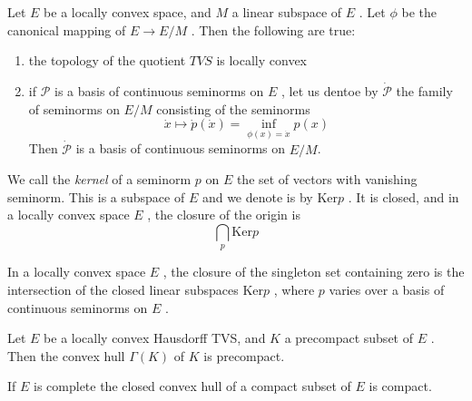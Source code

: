 \begin{prop}
	Let $ E $ be a locally convex space, and $ M $ a linear subspace of $ E $ . Let $ \phi $ be the canonical mapping of $ E \to E/M $ . Then the following are true:
	\begin{enumerate}
		\item the topology of the quotient $ TVS $ is locally convex
		\item if $ \mathcal{P} $ is a basis of continuous seminorms on $ E $ , let us dentoe by $ \dot{ \mathcal{P} } $ the family of seminorms on $ E/M $  consisting of the seminorms
			\[
				\dot{x} \mapsto \dot{p}(\dot{x}) = \inf_{ \phi(x) = \dot{x} } p(x)
			\]
		Then $ \dot{ \mathcal{P} } $ is a basis of continuous seminorms on  $ E/M $.
	\end{enumerate}
\end{prop}

We call the \textit{kernel} of a seminorm $ p $ on $ E $ the set of vectors with vanishing seminorm. This is a subspace of $ E $ and we denote is by $ \mathrm{ Ker }p $ . It is closed, and in a locally convex space $ E $ , the closure of the origin is 
\[
\bigcap_{ p } \mathrm{ Ker } p
\]

\begin{prop}
	In a locally convex space $ E $ , the closure of the singleton set containing zero is the intersection of the closed linear subspaces $ \mathrm{ Ker }p $ , where $ p $ varies over a basis of continuous seminorms on $ E $ .
\end{prop}

\begin{prop}
	Let $ E $ be a locally convex Hausdorff TVS, and $ K $ a precompact subset of $ E $ . Then the convex hull $ \Gamma(K) $ of $ K $ is precompact.
\end{prop}

\begin{cor}
	If $ E $ is complete the closed convex hull of a compact subset of $ E $ is compact.
\end{cor}

